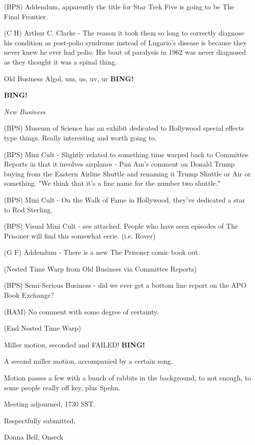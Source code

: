 \documentclass[12pt]{article}
\newcommand{\bing}{{\bf BING!} }
\newcommand{\goto}[1]{\bing \vskip 12pt \centerline{{\em{#1}}}}
\begin{document}
(BPS) Addendum, apparently the title for Star Trek Five is going to be The Final Frontier.

(C H) Arthur C. Clarke - The reason it took them so long to correctly diagnose his condition as post-polio syndrome instead of Lugario's disease is because they never knew he ever had polio. His bout of paralysis in 1962 was never diagnosed as they thought it was a spinal thing.

Old Business Algol, um, us, uv, ur \bing

\goto{New Business}

(BPS) Museum of Science has an exhibit dedicated to Hollywood special effects type things. Really interesting and worth going to.

(BPS) Mini Cult - Slightly related to something time warped back to Committee Reports in that it involves airplanes - Pan Am's comment on Donald Trump buying from the Eastern Airline Shuttle and renaming it Trump Shuttle or Air or something. "We think that it's a fine name for the number two shuttle."

(BPS) Mini Cult - On the Walk of Fame in Hollywood, they've dedicated a star to Rod Sterling.

(BPS) Visual Mini Cult - see attached.  People who have seen episodes of The Prisoner will find this somewhat eerie. (i.e. Rover)

(G F) Addendum - There is a new The Prisoner comic book out.

(Nested Time Warp from Old Business via Committee Reports)

(BPS) Semi-Serious Business - did we ever get a bottom line report on the APO Book Exchange?

(HAM) No comment with some degree of certainty.

(End Nested Time Warp)

Miller motion, seconded and FAILED! \bing

A second miller motion, accompanied by a certain song.

Motion passes a few with a bunch of rabbits in the background, to not enough, to some people really off key, plus Spehn.

\vspace{12pt}

\noindent
Meeting adjourned, 1730 SST.

\vspace{18pt}

\centerline{Respectfully submitted,}
\centerline{Donna Bell, Onseck}
\end{document}
